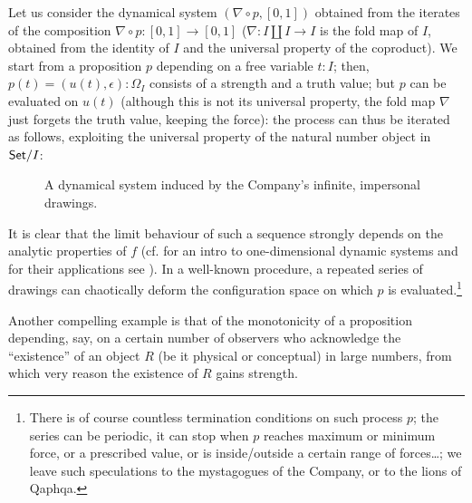 \begin{example}
  Let us consider the dynamical system $(\nabla\circ p, [0,1])$ obtained from the iterates of the composition $\nabla \circ p : [0,1] \to [0,1]$ ($\nabla : I\amalg I \to I$ is the fold map of $I$, obtained from the identity of $I$ and the universal property of the coproduct). We start from a proposition $p$ depending on a free variable $t : I$; then, $p(t) = (u(t),\epsilon): \Omega_I$ consists of a strength and a truth value; but $p$ can be evaluated on $u(t)$ (although this is not its universal property, the fold map $\nabla$ just forgets the truth value, keeping the force): the process can thus be iterated as follows, exploiting the universal property of the natural number object in $\mathsf{Set}/I$:
  \begin{center}
    \begin{figure}[h]
      \def\line{\draw (0,0) -- (1,0); \draw (0,.5) -- (1,.5);}
      \caption{A dynamical system induced by the Company's infinite, impersonal drawings.}
      \label{fig_dynamics}
    \end{figure}
  \end{center}
  It is clear that the limit behaviour of such a sequence strongly depends on the analytic properties of $f$ (cf. \cite{strogatz1996nonlinear} for an intro to one-dimensional dynamic systems and for their applications see \cite{wiggins2003introduction}). In a well-known procedure, a repeated series of drawings can chaotically deform the configuration space on which $p$ is evaluated.\footnote{There is of course countless termination conditions on such process $p$; the series can be periodic, it can stop when $p$ reaches maximum or minimum force, or a prescribed value, or is inside/outside a certain range of forces\dots; we leave such speculations to the mystagogues of the Company, or to the lions of Qaphqa.}
\end{example}
Another compelling example is that of the monotonicity of a proposition depending, say, on a certain number of observers who acknowledge the ``existence'' of an object $R$ (be it physical or conceptual) in large numbers, from which very reason the existence of $R$ gains strength.
